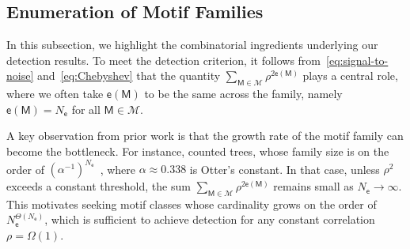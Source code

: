 \documentclass[letterpaper,11pt]{article}
\theoremstyle{definition}
\newtheorem{remark}{Remark}
\newcommand{\maM}{\mathcal{M}}
\newcommand{\maP}{\mathcal{P}}
\newcommand{\en}{\mathsf{{e}}}
\newcommand{\sfM}{{\mathsf{M}}}
\newcommand{\sfe}{{\mathsf{e}}}
\begin{document}




\subsection{Enumeration of Motif Families}
\label{subsec:comb-contrib}

In this subsection, we highlight the combinatorial ingredients underlying our detection results.
To meet the detection criterion, it follows from~\eqref{eq:signal-to-noise} and~\eqref{eq:Chebyshev} that the quantity $\sum_{\sfM\in \maM}\rho^{2\en(\sfM)}$ plays a central role, where we often take $\en(\sfM)$ to be the same across the family, namely $\en(\sfM)=N_\sfe$ for all $\sfM\in\maM$.

A key observation from prior work is that the growth rate of the motif family can become the bottleneck.
For instance, \cite{wu2023testing} counted trees, whose family size is on the order of $(\alpha^{-1})^{N_\sfe}$~\cite{otter1948number}, where $\alpha\approx 0.338$ is Otter's constant.
In that case, unless $\rho^2$ exceeds a constant threshold, the sum $\sum_{\sfM\in\maM}\rho^{2\en(\sfM)}$ remains small as $N_\sfe\to\infty$.
This motivates seeking motif classes whose cardinality grows on the order of $N_\sfe^{\Theta(N_\sfe)}$, which is sufficient to achieve detection for any constant correlation $\rho=\Omega(1)$.
\end{document}
